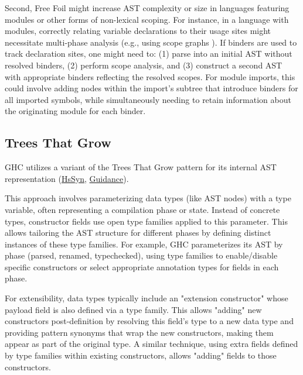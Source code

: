 Second, Free Foil might increase AST complexity or size in languages featuring modules or other forms of non-lexical scoping. For instance, in a language with modules, correctly relating variable declarations to their usage sites might necessitate multi-phase analysis (e.g., using scope graphs \cite{poulsen-monadic-2023}). If binders are used to track declaration sites, one might need to: (1) parse into an initial AST without resolved binders, (2) perform scope analysis, and (3) construct a second AST with appropriate binders reflecting the resolved scopes. For module imports, this could involve adding nodes within the import's subtree that introduce binders for all imported symbols, while simultaneously needing to retain information about the originating module for each binder.

\subsection{Trees That Grow}
\label{chap:LiteratureReview:sec:AstRepresentations:TreesThatGrow}

GHC utilizes a variant of the Trees That Grow pattern \cite{trees-that-grow-2016} for its internal AST representation (\href{https://gitlab.haskell.org/ghc/ghc/-/wikis/implementing-trees-that-grow/hs-syn}{HsSyn}, \href{https://gitlab.haskell.org/ghc/ghc/-/wikis/implementing-trees-that-grow/trees-that-grow-guidance}{Guidance}).

This approach involves parameterizing data types (like AST nodes) with a type variable, often representing a compilation phase or state. Instead of concrete types, constructor fields use open type families applied to this parameter. This allows tailoring the AST structure for different phases by defining distinct instances of these type families. For example, GHC parameterizes its AST by phase (parsed, renamed, typechecked), using type families to enable/disable specific constructors or select appropriate annotation types for fields in each phase.

For extensibility, data types typically include an "extension constructor" whose payload field is also defined via a type family. This allows "adding" new constructors post-definition by resolving this field's type to a new data type and providing pattern synonyms that wrap the new constructors, making them appear as part of the original type. A similar technique, using extra fields defined by type families within existing constructors, allows "adding" fields to those constructors.

